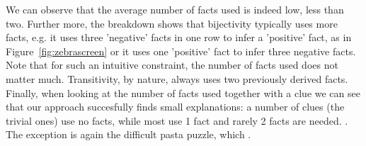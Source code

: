 We can observe that the average number of facts used is indeed low, less than two. Further more, the breakdown shows that bijectivity typically uses more facts, e.g. it uses three 'negative' facts in one row to infer a 'positive' fact, as in Figure~\ref{fig:zebrascreen} or it uses one 'positive' fact to infer three negative facts. Note that for such an intuitive constraint, the number of facts used does not matter much. Transitivity, by nature, always uses two previously derived facts. Finally, when looking at the number of facts used together with a clue we can see that our approach succesfully finds small explanations: a number of clues (the trivial ones) use no facts, while most use 1 fact and rarely 2 facts are needed. . The exception is again the difficult pasta puzzle, which .


\begin{table}
	\centering
	\caption{Puzzle explanation cost based on the cost function $f(I, C)$ and statistics on puzzle constraints}
	\label{table:sequence_leve}
\end{table}



